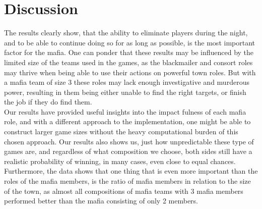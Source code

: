 \section{Discussion}\label{sec:discussion}
The results clearly show, that the ability to eliminate players during the 
night, and to be able to continue doing so for as long as possible, is the most 
important factor for the mafia. One can ponder that these results may be 
influenced by the limited size of the
teams used in the games, as the blackmailer and consort roles may thrive when
being able to use their actions on powerful town roles. But with a mafia team
of size 3 these roles may lack enough investigative and murderous power,
resulting in them being either unable to find the right targets, or finish the
job if they do find them.\\ Our results have provided useful insights into the
impact fulness of each mafia role, and with a different approach to the
implementation, one might be able to construct larger game sizes without the
heavy computational burden of this chosen approach. Our results also shows us,
just how unpredictable these type of games are, and regardless of what
composition we choose, both sides still have a realistic probability of
winning, in many cases, even close to equal chances.\\ Furthermore, the data
shows that one thing that is even more important than the roles of the mafia
members, is the ratio of mafia members in relation to the size of the town, as
almost all compositions of mafia teams with 3 mafia members performed better
than the mafia consisting of only 2 members.